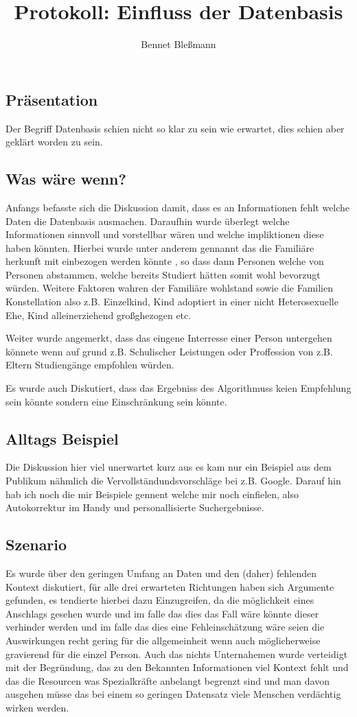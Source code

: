 \documentclass[12pt,a4paper]{article}
\author{Bennet Bleßmann}
\title{Protokoll: Einfluss der Datenbasis}
\begin{document}
\maketitle

\subsection*{Präsentation}
	Der Begriff Datenbasis schien nicht so klar zu sein wie erwartet,
	dies schien aber geklärt worden zu sein.
\subsection*{Was wäre wenn?}
	Anfangs befasste sich die Diskussion damit,
	dass es an Informationen fehlt welche Daten die Datenbasis ausmachen.
	Daraufhin wurde überlegt welche Informationen sinnvoll und vorstellbar wären und
	welche impliktionen diese haben könnten.
	Hierbei wurde unter anderem gennannt das die Familiäre herkunft 
	mit einbezogen werden könnte , so dass dann Personen welche von Personen abstammen,
	welche bereits Studiert hätten somit wohl bevorzugt würden.
	Weitere Faktoren wahren der Familiäre wohlstand sowie die Familien Konstellation
	also z.B.	Einzelkind,
				Kind adoptiert in einer nicht Heterosexuelle Ehe,
				Kind alleinerziehend großghezogen etc.
				 
	Weiter wurde angemerkt,
	 dass das eingene Interresse einer Person untergehen könnete wenn auf grund z.B.
	 Schulischer Leistungen oder Proffession von z.B. Eltern Studiengänge empfohlen würden.
	
	Es wurde auch Diskutiert,
	dass das Ergebniss des Algorithmuss keien Empfehlung sein könnte
	sondern eine Einschränkung sein könnte.
		
\subsection*{Alltags Beispiel}
	Die Diskussion hier viel unerwartet kurz aus es kam nur ein Beispiel aus dem Publikum 
	nähmlich die Vervollständundsvorschläge bei z.B. Google.
	Darauf hin hab ich noch die mir Beispiele gennent welche mir noch einfielen, also Autokorrektur im Handy und personallisierte Suchergebnisse.

\subsection*{Szenario}

	Es wurde über den geringen Umfang an Daten und den (daher) fehlenden Kontext diskutiert,
	für alle drei erwarteten Richtungen haben sich Argumente gefunden, es tendierte hierbei dazu Einzugreifen, da die möglichkeit eines Anschlags gesehen wurde und im falle das dies das Fall wäre könnte dieser verhinder werden und im falle das dies eine Fehleinschätzung wäre seien die Auswirkungen recht gering für die allgemeinheit wenn auch möglicherweise gravierend für die einzel Person. Auch das nichts Unternahemen wurde verteidigt mit der Begründung, das zu den Bekannten Informationen viel Kontext fehlt und das die Resourcen was Spezialkräfte anbelangt begrenzt sind und man davon ausgehen müsse das bei einem so geringen Datensatz viele Menschen verdächtig wirken werden.
	
\end{document}
